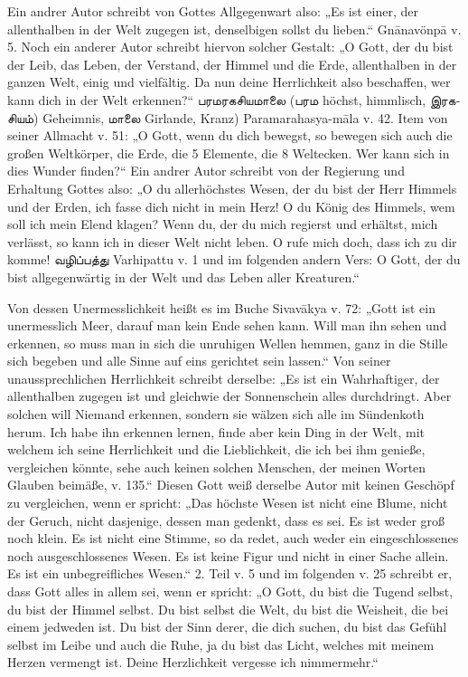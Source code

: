 \documentclass{article}
\newcommand{\TamilText}[1]{\texttamil{#1}}
\newcommand{\tam}[1]{\TamilText{#1}}
\begin{document}
Ein andrer Autor schreibt von Gottes Allgegenwart also: „Es ist einer, der allenthalben in der Welt zugegen ist, denselbigen sollst du lieben.“ Gn\={a}navönp\={a} v. 5. Noch ein anderer Autor schreibt hiervon solcher Gestalt: „O Gott, der du bist der Leib, das Leben, der Verstand, der Himmel und die Erde, allenthalben in der ganzen Welt, einig und vielfältig. Da nun deine Herrlichkeit also beschaffen, wer kann dich in der Welt erkennen?“ \tam{பரமரகசியமாலை} (\tam{பரம} höchst, himmlisch, \tam{இரகசியம்}) Geheimnis, \tam{மாலை} Girlande, Kranz) Paramarahasya-m\={a}la v. 42. Item von seiner Allmacht v. 51: „O Gott, wenn du dich bewegst, so bewegen sich auch die großen Weltkörper, die Erde, die 5 Elemente, die 8 Weltecken. Wer kann sich in dies Wunder finden?“ Ein andrer Autor schreibt von der Regierung und Erhaltung Gottes also: „O du allerhöchstes Wesen, der du bist der Herr Himmels und der Erden, ich fasse dich nicht in mein Herz! O du König des Himmels, wem soll ich mein Elend klagen? Wenn du, der du mich regierst und erhältst, mich verlässt, so kann ich in dieser Welt nicht leben. O rufe mich doch, dass ich zu dir komme! \tam{வழிப்பத்து} Varhipattu v. 1 und im folgenden andern Vers: O Gott, der du bist allgegenwärtig in der Welt und das Leben aller Kreaturen.“

Von dessen Unermesslichkeit heißt es im Buche Sivav\={a}kya v. 72: „Gott ist ein unermesslich Meer, darauf man kein Ende sehen kann. Will man ihn sehen und erkennen, so muss man in sich die unruhigen Wellen hemmen, ganz in die Stille sich begeben und alle Sinne auf eins gerichtet sein lassen.“ Von seiner unaussprechlichen Herrlichkeit schreibt derselbe: „Es ist ein Wahrhaftiger, der allenthalben zugegen ist und gleichwie der Sonnenschein alles durchdringt. Aber solchen will Niemand erkennen, sondern sie wälzen sich alle im Sündenkoth herum. Ich habe ihn erkennen lernen, finde aber kein Ding in der Welt, mit welchem ich seine Herrlichkeit und die Lieblichkeit, die ich bei ihm genieße, vergleichen könnte, sehe auch keinen solchen Menschen, der meinen Worten Glauben beimäße, v. 135.“ Diesen Gott weiß derselbe Autor mit keinen Geschöpf zu vergleichen, wenn er spricht: „Das höchste Wesen ist nicht eine Blume, nicht der Geruch, nicht dasjenige, dessen man gedenkt, dass es sei. Es ist weder groß noch klein. Es ist nicht eine Stimme, so da redet, auch weder ein eingeschlossenes noch ausgeschlossenes Wesen. Es ist keine Figur und nicht in einer Sache allein. Es ist ein unbegreifliches Wesen.“ 2. Teil v. 5 und im folgenden v. 25 schreibt er, dass Gott alles in allem sei, wenn er spricht: „O Gott, du bist die Tugend selbst, du bist der Himmel selbst. Du bist selbst die Welt, du bist die Weisheit, die bei einem jedweden ist. Du bist der Sinn derer, die dich suchen, du bist das Gefühl selbst im Leibe und auch die Ruhe, ja du bist das Licht, welches mit meinem Herzen vermengt ist. Deine Herzlichkeit vergesse ich nimmermehr.“
\end{document}
